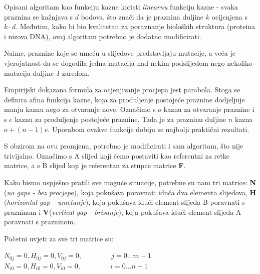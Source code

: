 \documentclass[times, utf8, zavrsni, numeric]{fer}
\begin{document}
Opisani algoritam kao funkciju kazne koristi \emph{linearnu} funkciju kazne - svaka praznina se kažnjava s $d$ bodova, što znači da je praznina duljine $k$ ocijenjena s $k\cdot d$. Međutim, kako bi bio kvalitetan za poravnanje bioloških struktura (proteina i nizova DNA), ovaj algoritam potrebno je dodatno modificirati.

Naime, praznine koje se umeću u slijedove predstavljaju mutacije, a veća je vjerojatnost da se dogodila jedna mutacija nad nekim podslijedom nego nekoliko mutacija duljine \emph{1} zaredom.

Empirijski dokazana formula za ocjenjivanje procjepa jest parabola. Stoga se definira afina funkcija kazne, koja za produljenje postojeće praznine dodjeljuje manju kaznu nego za otvaranje nove. Označimo s $o$ kaznu za otvaranje praznine i s $e$ kaznu za produljenje postojeće praznine. Tada je za prazninu duljine $n$ kazna  $o + (n - 1)e$. Uporabom ovakve funkcije dobiju se najbolji praktični rezultati.\cite{gapopen}

S obzirom na ovu promjenu, potrebno je modificirati i sam algoritam, što nije trivijalno. Označimo s A slijed koji ćemo postaviti kao referentni za retke matrice, a s B slijed koji je referentan za stupce matrice \textbf{F}.

Kako bismo uspješno pratili sve moguće situacije, potrebne su nam tri matrice: \textbf{N} (\emph{no gaps - bez procjepa}), koja pokušava poravnati iduća dva elementa slijedova, \textbf{H} (\emph{horizontal gap - umetanje}), koja pokušava idući element slijeda B poravnati s prazninom i \textbf{V}(\emph{vertical gap - brisanje}), koja pokušava idući element slijeda A poravnati s prazninom.

Početni uvjeti za sve tri matrice su:
\begin{center}
$N_{0j} = 0, H_{0j} = 0, V_{0j} = 0,\hspace{50pt} j = 0...m-1$\\
$N_{i0} = 0, H_{i0} = 0, V_{i0} = 0,\hspace{50pt} i = 0...n-1$
\end{center}
\end{document}
